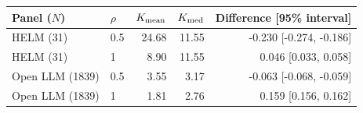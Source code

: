 \begin{tabular}{llrrr}
\toprule
Panel ($N$) & $\rho$ & $K_{\rm mean}$ & $K_{\rm med}$ & Difference [95\% interval] \\
\midrule
HELM (31) & 0.5 & 24.68 & 11.55 & -0.230 [-0.274, -0.186] \\ 
HELM (31) & 1 & 8.90 & 11.55 & 0.046 [0.033, 0.058] \\ 
Open LLM (1839) & 0.5 & 3.55 & 3.17 & -0.063 [-0.068, -0.059] \\ 
Open LLM (1839) & 1 & 1.81 & 2.76 & 0.159 [0.156, 0.162] \\ 
\bottomrule
\end{tabular}